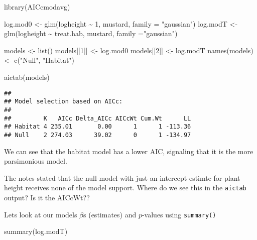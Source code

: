 \documentclass[
]{article}
\newenvironment{Shaded}{\begin{snugshade}}{\end{snugshade}}
\newcommand{\AttributeTok}[1]{\textcolor[rgb]{0.77,0.63,0.00}{#1}}
\newcommand{\DecValTok}[1]{\textcolor[rgb]{0.00,0.00,0.81}{#1}}
\newcommand{\FunctionTok}[1]{\textcolor[rgb]{0.00,0.00,0.00}{#1}}
\newcommand{\NormalTok}[1]{#1}
\newcommand{\OtherTok}[1]{\textcolor[rgb]{0.56,0.35,0.01}{#1}}
\newcommand{\SpecialCharTok}[1]{\textcolor[rgb]{0.00,0.00,0.00}{#1}}
\newcommand{\StringTok}[1]{\textcolor[rgb]{0.31,0.60,0.02}{#1}}
\begin{document}
\begin{Shaded}
\begin{Highlighting}[]
\FunctionTok{library}\NormalTok{(AICcmodavg)}

\NormalTok{log.mod0 }\OtherTok{\textless{}{-}} \FunctionTok{glm}\NormalTok{(logheight }\SpecialCharTok{\textasciitilde{}} \DecValTok{1}\NormalTok{, mustard, }\AttributeTok{family =} \StringTok{"gaussian"}\NormalTok{)}
\NormalTok{log.modT }\OtherTok{\textless{}{-}} \FunctionTok{glm}\NormalTok{(logheight }\SpecialCharTok{\textasciitilde{}}\NormalTok{ treat.hab, mustard, }\AttributeTok{family =}\StringTok{"gaussian"}\NormalTok{)}

\NormalTok{models }\OtherTok{\textless{}{-}} \FunctionTok{list}\NormalTok{()}
\NormalTok{models[[}\DecValTok{1}\NormalTok{]] }\OtherTok{\textless{}{-}}\NormalTok{ log.mod0}
\NormalTok{models[[}\DecValTok{2}\NormalTok{]] }\OtherTok{\textless{}{-}}\NormalTok{ log.modT}
\FunctionTok{names}\NormalTok{(models) }\OtherTok{\textless{}{-}} \FunctionTok{c}\NormalTok{(}\StringTok{"Null"}\NormalTok{, }\StringTok{"Habitat"}\NormalTok{)}

\FunctionTok{aictab}\NormalTok{(models)}
\end{Highlighting}
\end{Shaded}

\begin{verbatim}
## 
## Model selection based on AICc:
## 
##         K   AICc Delta_AICc AICcWt Cum.Wt      LL
## Habitat 4 235.01       0.00      1      1 -113.36
## Null    2 274.03      39.02      0      1 -134.97
\end{verbatim}

We can see that the habitat model has a lower AIC, signaling that it is
the more parsimonious model.

The notes stated that the null-model with just an intercept estimte for
plant height receives none of the model support. Where do we see this in
the \texttt{aictab} output? Is it the AICcWt??

Lets look at our models \(\beta\)s (estimates) and \(p\)-values using
\texttt{summary()}

\begin{Shaded}
\begin{Highlighting}[]
\FunctionTok{summary}\NormalTok{(log.modT)}
\end{Highlighting}
\end{Shaded}
\end{document}
